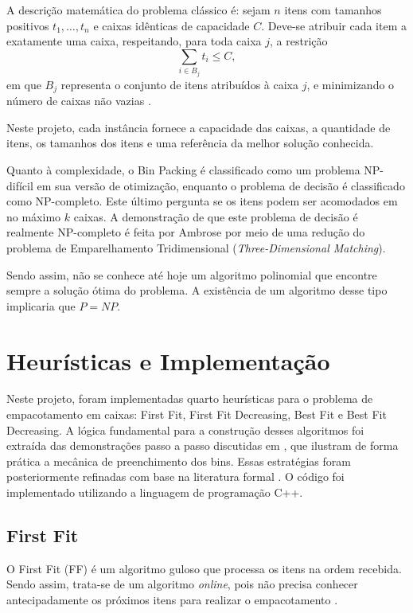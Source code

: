 \documentclass[12pt]{article}
\begin{document}
A descrição matemática do problema clássico é: sejam $n$ itens com tamanhos positivos $t_1,\ldots,t_n$ e caixas idênticas de capacidade $C$. Deve-se atribuir cada item a exatamente uma caixa, respeitando, para toda caixa $j$, a restrição
\begin{equation}
  \sum_{i\in B_j} t_i \leq C,
\end{equation}
em que $B_j$ representa o conjunto de itens atribuídos à caixa $j$, e minimizando o número de caixas não vazias \cite{ambrose2025}.

Neste projeto, cada instância fornece a capacidade das caixas, a quantidade de itens, os tamanhos dos itens e uma referência da melhor solução conhecida.

Quanto à complexidade, o Bin Packing é classificado como um problema NP-difícil em sua versão de otimização, enquanto o problema de decisão é classificado como NP-completo. Este último pergunta se os itens podem ser acomodados em no máximo $k$ caixas. A demonstração de que este problema de decisão é realmente NP-completo é feita por Ambrose \cite{ambrose2025} por meio de uma redução do problema de Emparelhamento Tridimensional (\textit{Three-Dimensional Matching}).

Sendo assim, não se conhece até hoje um algoritmo polinomial que encontre sempre a solução ótima do problema. A existência de um algoritmo desse tipo implicaria que $P=NP$.

\section{Heurísticas e Implementação}

Neste projeto, foram implementadas quarto heurísticas para o problema de empacotamento em caixas: First Fit, First Fit Decreasing, Best Fit e  Best Fit Decreasing. A lógica fundamental para a construção desses algoritmos foi extraída das demonstrações passo a passo discutidas em \cite{video_youtube}, que ilustram de forma prática a mecânica de preenchimento dos bins. Essas estratégias foram posteriormente refinadas com base na literatura formal \cite{ambrose2025, friesen1986}. O código foi implementado utilizando a linguagem de programação C++.

\subsection{First Fit}

O First Fit (FF) é um algoritmo guloso que processa os itens na ordem recebida. Sendo assim, trata-se de um algoritmo \textit{online}, pois não precisa conhecer antecipadamente os próximos itens para realizar o empacotamento \cite{ambrose2025}. 
\end{document}
